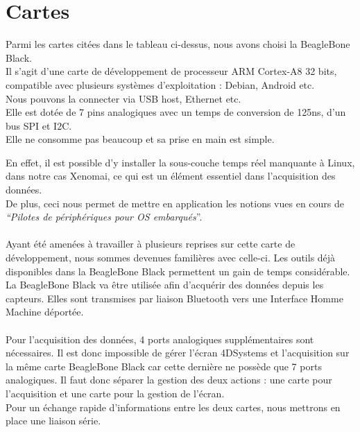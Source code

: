 \documentclass{report}
\begin{document}
\section{Cartes}

Parmi les cartes cit\'{e}es dans le tableau ci-dessus, nous avons choisi la BeagleBone Black. \\



Il s’agit d’une carte de d\'{e}veloppement de processeur ARM Cortex-A8 32 bits, compatible
avec plusieurs syst\`{e}mes d’exploitation : Debian, Android etc.\\
Nous pouvons la connecter via USB host, Ethernet etc.\\
Elle est dot\'{e}e de 7 pins analogiques avec un temps de conversion de 125ns, d’un bus SPI et
I2C.\\
Elle ne consomme pas beaucoup et sa prise en main est simple.



En effet, il est possible d’y installer la sous-couche temps r\'{e}el manquante \`{a} Linux, dans notre
cas Xenomai, ce qui est un \'{e}l\'{e}ment essentiel dans l’acquisition des donn\'{e}es.\\
De plus, ceci nous permet de mettre en application les notions vues en cours de \textit{“Pilotes de
p\'{e}riph\'{e}riques pour OS embarqu\'{e}s}”.\\ \\

Ayant \'{e}t\'{e} amen\'{e}es \`{a} travailler \`{a} plusieurs reprises sur cette carte de d\'{e}veloppement, nous
sommes devenues famili\`{e}res avec celle-ci. Les outils d\'{e}j\`{a} disponibles dans la BeagleBone
Black permettent un gain de temps consid\'{e}rable. La BeagleBone Black va \^{e}tre utilis\'{e}e afin
d'acqu\'{e}rir des donn\'{e}es depuis les capteurs. Elles sont transmises par liaison Bluetooth vers
une Interface Homme Machine d\'{e}port\'{e}e.\\ \\

Pour l’acquisition des donn\'{e}es, 4 ports analogiques suppl\'{e}mentaires sont n\'{e}cessaires. Il est
donc impossible de g\'{e}rer l’\'{e}cran 4DSystems et l’acquisition sur la m\^{e}me carte BeagleBone
Black car cette derni\`{e}re ne poss\`{e}de que 7 ports analogiques. Il faut donc s\'{e}parer la gestion
des deux actions : une carte pour l’acquisition et une carte pour la gestion de l’\'{e}cran.\\
Pour un \'{e}change rapide d’informations entre les deux cartes, nous mettrons en place une
liaison s\'{e}rie.\\ \\
\end{document}
